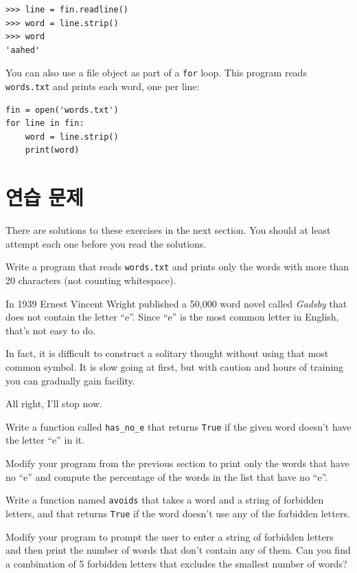 \documentclass[10pt]{book}
\begin{document}
\begin{verbatim}
>>> line = fin.readline()
>>> word = line.strip()
>>> word
'aahed'
\end{verbatim}
%
You can also use a file object as part of a {\tt for} loop.
This program reads {\tt words.txt} and prints each word, one
per line:

\begin{verbatim}
fin = open('words.txt')
for line in fin:
    word = line.strip()
    print(word)
\end{verbatim}
%

\section{연습 문제}

There are solutions to these exercises in the next section.
You should at least attempt each one before you read the solutions.

\begin{exercise}
Write a program that reads {\tt words.txt} and prints only the
words with more than 20 characters (not counting whitespace).

\end{exercise}

\begin{exercise}

In 1939 Ernest Vincent Wright published a 50,000 word novel called
{\em Gadsby} that does not contain the letter ``e''.  Since ``e'' is
the most common letter in English, that's not easy to do.

In fact, it is difficult to construct a solitary thought without using
that most common symbol.  It is slow going at first, but with caution
and hours of training you can gradually gain facility.

All right, I'll stop now.

Write a function called \verb"has_no_e" that returns {\tt True} if
the given word doesn't have the letter ``e'' in it.

Modify your program from the previous section to print only the words
that have no ``e'' and compute the percentage of the words in the list
that have no ``e''.

\end{exercise}


\begin{exercise} 

Write a function named {\tt avoids}
that takes a word and a string of forbidden letters, and
that returns {\tt True} if the word doesn't use any of the forbidden
letters.

Modify your program to prompt the user to enter a string
of forbidden letters and then print the number of words that
don't contain any of them.
Can you find a combination of 5 forbidden letters that
excludes the smallest number of words?

\end{exercise}
\end{document}
